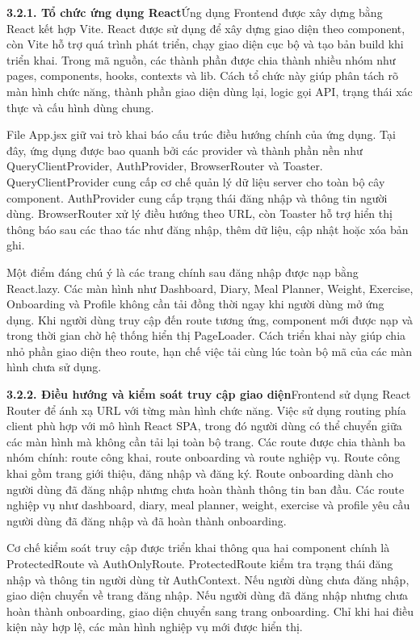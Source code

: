 \textbf{3.2.1. Tổ chức ứng dụng React}Ứng dụng Frontend được xây dựng bằng React kết hợp Vite. React được sử dụng để xây dựng giao diện theo component, còn Vite hỗ trợ quá trình phát triển, chạy giao diện cục bộ và tạo bản build khi triển khai. Trong mã nguồn, các thành phần được chia thành nhiều nhóm như pages, components, hooks, contexts và lib. Cách tổ chức này giúp phân tách rõ màn hình chức năng, thành phần giao diện dùng lại, logic gọi API, trạng thái xác thực và cấu hình dùng chung.

File App.jsx giữ vai trò khai báo cấu trúc điều hướng chính của ứng dụng. Tại đây, ứng dụng được bao quanh bởi các provider và thành phần nền như QueryClientProvider, AuthProvider, BrowserRouter và Toaster. QueryClientProvider cung cấp cơ chế quản lý dữ liệu server cho toàn bộ cây component. AuthProvider cung cấp trạng thái đăng nhập và thông tin người dùng. BrowserRouter xử lý điều hướng theo URL, còn Toaster hỗ trợ hiển thị thông báo sau các thao tác như đăng nhập, thêm dữ liệu, cập nhật hoặc xóa bản ghi.

Một điểm đáng chú ý là các trang chính sau đăng nhập được nạp bằng React.lazy. Các màn hình như Dashboard, Diary, Meal Planner, Weight, Exercise, Onboarding và Profile không cần tải đồng thời ngay khi người dùng mở ứng dụng. Khi người dùng truy cập đến route tương ứng, component mới được nạp và trong thời gian chờ hệ thống hiển thị PageLoader. Cách triển khai này giúp chia nhỏ phần giao diện theo route, hạn chế việc tải cùng lúc toàn bộ mã của các màn hình chưa sử dụng.

\textbf{3.2.2. Điều hướng và kiểm soát truy cập giao diện}Frontend sử dụng React Router để ánh xạ URL với từng màn hình chức năng. Việc sử dụng routing phía client phù hợp với mô hình React SPA, trong đó người dùng có thể chuyển giữa các màn hình mà không cần tải lại toàn bộ trang. Các route được chia thành ba nhóm chính: route công khai, route onboarding và route nghiệp vụ. Route công khai gồm trang giới thiệu, đăng nhập và đăng ký. Route onboarding dành cho người dùng đã đăng nhập nhưng chưa hoàn thành thông tin ban đầu. Các route nghiệp vụ như dashboard, diary, meal planner, weight, exercise và profile yêu cầu người dùng đã đăng nhập và đã hoàn thành onboarding.

Cơ chế kiểm soát truy cập được triển khai thông qua hai component chính là ProtectedRoute và AuthOnlyRoute. ProtectedRoute kiểm tra trạng thái đăng nhập và thông tin người dùng từ AuthContext. Nếu người dùng chưa đăng nhập, giao diện chuyển về trang đăng nhập. Nếu người dùng đã đăng nhập nhưng chưa hoàn thành onboarding, giao diện chuyển sang trang onboarding. Chỉ khi hai điều kiện này hợp lệ, các màn hình nghiệp vụ mới được hiển thị.


